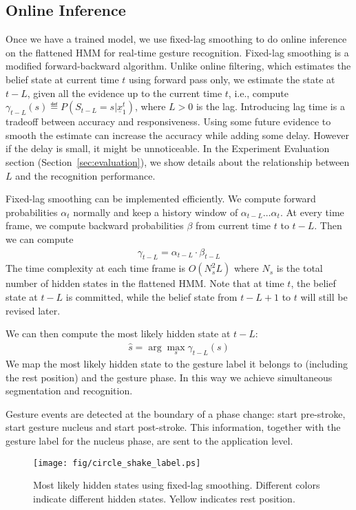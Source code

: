 \subsection{Online Inference}
Once we have a trained model, we use fixed-lag smoothing \cite{murphy02} to do
online inference on the flattened HMM for real-time gesture recognition.
Fixed-lag smoothing is a modified forward-backward algorithm. Unlike online
filtering, which estimates the belief state at current time $t$ using forward
pass only, we estimate the state at $t - L$, given all the evidence up to the
current time $t$, i.e., compute $\gamma_{t - L}(s) \eqdef P(S_{t -
L} = s|\underline{x}_1^t)$, where $L > 0$ is the lag. Introducing lag time is a
tradeoff between accuracy and responsiveness. Using some future evidence to
smooth the estimate can increase the accuracy while adding some delay. However
if the delay is small, it might be unnoticeable.
In the Experiment Evaluation section (Section~\ref{sec:evaluation}), we show
details about the relationship between $L$ and the recognition performance.

Fixed-lag smoothing can be implemented efficiently. We compute forward
probabilities $\alpha_t$ normally and keep a history window of $\alpha_{t -
L}\ldots\alpha_t$. At every time frame, we compute backward probabilities
$\beta$ from current time $t$ to $t - L$. Then we can compute
\begin{align}
\gamma_{t - L} = \alpha_{t - L} \cdot \beta_{t - L}
\end{align}  
The time complexity at each time frame is $O(N_s^2L)$ where $N_s$ is the total
number of hidden states in the flattened HMM. Note that at time $t$, the belief
state at $t - L$ is committed, while the belief state from $t - L + 1$ to $t$ will still be revised later.

We can then compute the most likely hidden state at $t - L$:
\begin{align}
\hat{s} = \arg\max_s \gamma_{t - L}(s)
\end{align}
We map the most likely hidden state to the gesture label it
belongs to (including the rest position) and the gesture phase. In this way
we achieve simultaneous segmentation and recognition.

Gesture events are detected at the boundary of a phase change: start pre-stroke,
start gesture nucleus and start post-stroke. This information, together with the
gesture label for the nucleus phase, are sent to the application level.

\begin{figure}[t]
\centering
\texttt{[image: fig/circle\_shake\_label.ps]}
\caption{Most likely hidden states using fixed-lag smoothing. Different colors indicate different hidden states. Yellow indicates rest position.}
\label{fig:visual_hidden}
\end{figure}

